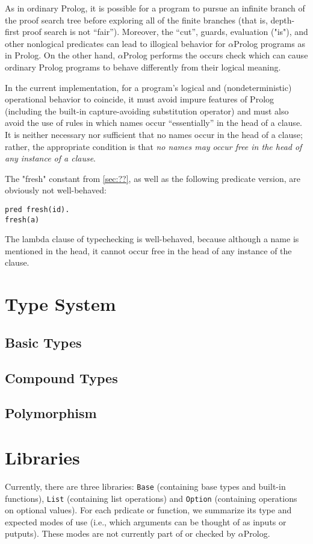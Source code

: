 \documentclass[draft,12pt]{report}
\newcommand{\aprolog}{$\alpha${Prolog}\xspace}
\begin{document}
As in ordinary Prolog, it is possible for a program to 
pursue an infinite branch of the proof search tree before exploring 
all of the finite branches (that is, depth-first proof search is not 
``fair'').  Moreover, the ``cut'', guards, evaluation ("is"), and other nonlogical predicates 
can lead to illogical behavior for \aprolog programs as in Prolog.  On the other hand, 
\aprolog performs the occurs check which 
can cause ordinary Prolog programs to behave differently from their 
logical meaning.

In the current implementation, for a program's logical and (nondeterministic) operational
behavior to coincide, it must avoid impure features of Prolog (including the built-in capture-avoiding substitution operator) and must also 
avoid the use of rules in which names occur ``essentially'' in the head of a clause. It is neither necessary nor sufficient that no names occur in the head of a clause; rather, the appropriate condition is that \emph{no names may occur free in the head of any instance of a clause}.

The "fresh" constant from \ref{sec:??}, as well as the following predicate version, are obviously not well-behaved:
\begin{verbatim}
pred fresh(id).
fresh(a)
\end{verbatim}

The lambda clause of typechecking is well-behaved, because although a name is mentioned in the head, it cannot occur free in the head of any instance of the clause.


\chapter{Type System}

\section{Basic Types}

\section{Compound Types}

\section{Polymorphism}




\appendix

\chapter{Libraries} 
Currently, there are three libraries: {\tt Base} (containing base
types and built-in functions), {\tt List} (containing list operations)
and {\tt Option} (containing operations on optional values).  For each
prdicate or function, we summarize its type and expected modes of use
(i.e., which arguments can be thought of as inputs or putputs).  These
modes are not currently part of or checked by \aprolog.
\end{document}
